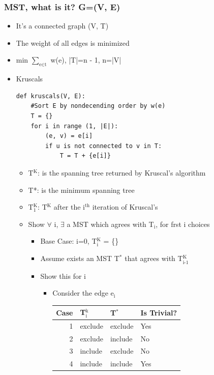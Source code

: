 \documentclass[11pt]{article}
\begin{document}
\subsubsection*{MST, what is it? G=(V, E)}
\label{sec:orge515fec}
\begin{itemize}
\item It's a connected graph (V, T)
\item The weight of all edges is minimized
\item min \(\sum_{\text{e}\in\text{t}}\) w(e), |T|=n - 1, n=|V|
\end{itemize}
\begin{itemize}
\item Kruscals
\label{sec:org2550319}
\begin{verbatim}
def kruscals(V, E):
    #Sort E by nondecending order by w(e)
    T = {}
    for i in range (1, |E|):
        (e, v) = e[i]
        if u is not connected to v in T:
            T = T + {e[i]}
\end{verbatim}
\begin{itemize}
\item T\(^{\text{K}}\): is the spanning tree returned by Kruscal's algorithm
\item T*: is the minimum spanning tree
\item T\(^{\text{K}}_{\text{1}}\): T\(^{\text{K}}\) after the i\(^{\text{th}}\) iteration of Kruscal's
\item Show \(\forall\) i, \(\exists\) a MST which agrees with T\(_{\text{i}}\), for frst i choices
\begin{itemize}
\item Base Case: i=0, T\(^{\text{K}}_{\text{i}}\) = \{\}
\item Assume exists an MST T\(^{\text{*}}\) that agrees with T\(^{\text{K}}_{\text{i-1}}\)
\item Show this for i
\begin{itemize}
\item Consider the edge e\(_{\text{i}}\)
\begin{center}
\begin{tabular}{rlll}
Case & T\(_{\text{i}}^{\text{k}}\) & T\(^{\text{*}}\) & Is Trivial?\\
\hline
1 & exclude & exclude & Yes\\
2 & exclude & include & No\\
3 & include & exclude & No\\
4 & include & include & Yes\\
\end{tabular}

\end{center}
\end{itemize}
\end{itemize}
\end{itemize}
\end{itemize}
\end{document}
